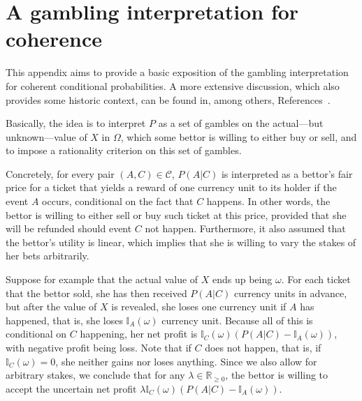\documentclass[10pt,a4paper]{paper}
\theoremstyle{definition}
\newcommand{\reals}{\mathbb{R}}
\newcommand{\realsnonneg}{\reals_{\geq 0}}
\newcommand{\ind}[1]{\mathbb{I}_{#1}}
\begin{document}



 


\appendix


\section{A gambling interpretation for coherence}\label{app:coherence}

This appendix aims to provide a basic exposition of the gambling interpretation for coherent conditional probabilities. A more extensive discussion, which also provides some historic context, can be found in, among others, References~\cite{regazzini1985finitely,williams1975,Williams:2007eu, Vicig:2007gs,berti1991coherent, berti2002coherent}.

Basically, the idea is to interpret $P$ as a set of gambles on the actual---but unknown---value of $X$ in $\Omega$, which some bettor is willing to either buy or sell, and to impose a rationality criterion on this set of gambles.

Concretely, for every pair $(A,C)\in\mathcal{C}$, $P(A\vert C)$ is interpreted as a bettor's fair price for a ticket that yields a reward of one currency unit to its holder if the event $A$ occurs, conditional on the fact that $C$ happens. In other words, the bettor is willing to either sell or buy such ticket at this price, provided that she will be refunded should event $C$ not happen. Furthermore, it also assumed that the bettor's utility is linear, which implies that she is willing to vary the stakes of her bets arbitrarily.


Suppose for example that the actual value of $X$ ends up being $\omega$. For each ticket that the bettor sold, she has then received $P(A\vert C)$ currency units in advance, but after the value of $X$ is revealed, she loses one currency unit if $A$ has happened, that is, she loses $\ind{A}(\omega)$ currency unit. Because all of this is conditional on $C$ happening, her net profit is $\ind{C}(\omega)(P(A\vert C) - \ind{A}(\omega))$, with negative profit being loss. Note that if $C$ does not happen, that is, if $\ind{C}(\omega)=0$, she neither gains nor loses anything. Since we also allow for arbitrary stakes, we conclude that for any $\lambda\in\realsnonneg$, the bettor is willing to accept the uncertain net profit $\lambda \ind{C}(\omega)(P(A\vert C) - \ind{A}(\omega))$.
\end{document}
